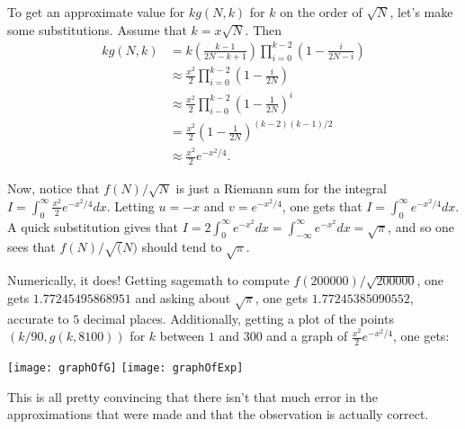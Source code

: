 \documentclass[11pt]{article}
\theoremstyle{definition}
\begin{document}
To get an approximate value for $kg(N,k)$ for $k$ on the order of $\sqrt{N}$, let's make some substitutions.  Assume that $k = x\sqrt{N}$.  Then
\begin{align*}
kg(N,k) & =  k\left(\frac{k-1}{2N-k+1}\right)\prod_{i = 0}^{k-2}\left(1-\frac{i}{2N-i}\right) \\
& \approx \frac{x^2}{2}\prod_{i=0}^{k-2}\left(1-\frac{i}{2N}\right)\\
& \approx \frac{x^2}{2}\prod_{i-0}^{k-2}\left(1-\frac{1}{2N}\right)^i\\
& = \frac{x^2}{2} \left(1-\frac{1}{2N}\right)^{(k-2)(k-1)/2} \\
& \approx \frac{x^2}{2} e^{-{x^2}/{4}}.
\end{align*}

Now, notice that $f(N)/\sqrt{N}$ is just a Riemann sum for the integral $I = \int_0^\infty \frac{x^2}{2} e^{-{x^2}/{4}}dx$.  Letting $u = -x$ and $v = e^{-x^2/4}$, one gets that $I = \int_0^\infty e^{-x^2/4}dx$.  A quick substitution gives that $I = 2\int_0^\infty e^{-x^2}dx = \int_{-\infty}^\infty e^{-x^2}dx = \sqrt{\pi}$, and so one sees that $f(N)/\sqrt(N)$ should tend to $\sqrt{\pi}$.

Numerically, it does!  Getting sagemath to compute $f(200000)/\sqrt{200000}$, one gets $1.77245495868951$ and asking about $\sqrt{\pi}$, one gets $1.77245385090552$, accurate to $5$ decimal places.  Additionally, getting a plot of the points $(k/90, g(k, 8100))$ for $k$ between $1$ and $300$ and a graph of $\frac{x^2}{2}e^{-x^2/4}$, one gets:

\texttt{[image: graphOfG]}
\texttt{[image: graphOfExp]}

This is all pretty convincing that there isn't that much error in the approximations that were made and that the observation is actually correct.
\end{document}

